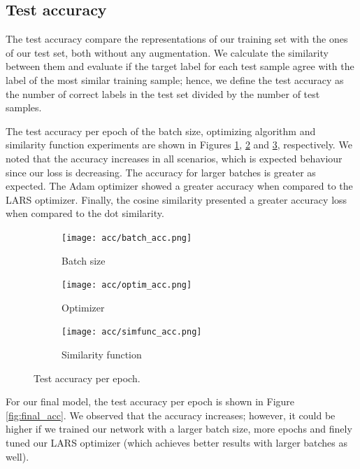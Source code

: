 \documentclass{article}
\begin{document}
\subsection{Test accuracy}

The test accuracy compare the representations of our training set with the ones of our test set, both without any augmentation. We calculate the similarity between them and evaluate if the target label for each test sample agree with the label of the most similar training sample; hence, we define the test accuracy as the number of correct labels in the test set divided by the number of test samples. 

The test accuracy per epoch of the batch size, optimizing algorithm and similarity function experiments are shown in Figures \ref{fig:batch_acc}, \ref{fig:optim_acc} and \ref{fig:simfunc_acc}, respectively. We noted that the accuracy increases in all scenarios, which is expected behaviour since our loss is decreasing. The accuracy for larger batches is greater as expected. The Adam optimizer showed a greater accuracy when compared to the LARS optimizer. Finally, the cosine similarity presented a greater accuracy loss when compared to the dot similarity.

\begin{figure}
  \begin{subfigure}[t]{0.33\textwidth}
    \centering
    \texttt{[image: acc/batch\_acc.png]}
    \caption{Batch size}
    \label{fig:batch_acc}
  \end{subfigure}
  \begin{subfigure}[t]{0.33\textwidth}
    \centering
    \texttt{[image: acc/optim\_acc.png]}
    \caption{Optimizer}
    \label{fig:optim_acc}
  \end{subfigure}
  \begin{subfigure}[t]{0.33\textwidth}
    \centering
    \texttt{[image: acc/simfunc\_acc.png]}
    \caption{Similarity function}
    \label{fig:simfunc_acc}
  \end{subfigure}
  \caption{Test accuracy per epoch.}
  \label{fig:exp_acc}
\end{figure}

For our final model, the test accuracy per epoch is shown in Figure \ref{fig:final_acc}. We observed that the accuracy increases; however, it could be higher if we trained our network with a larger batch size, more epochs and finely tuned our LARS optimizer (which achieves better results with larger batches as well).
\end{document}
